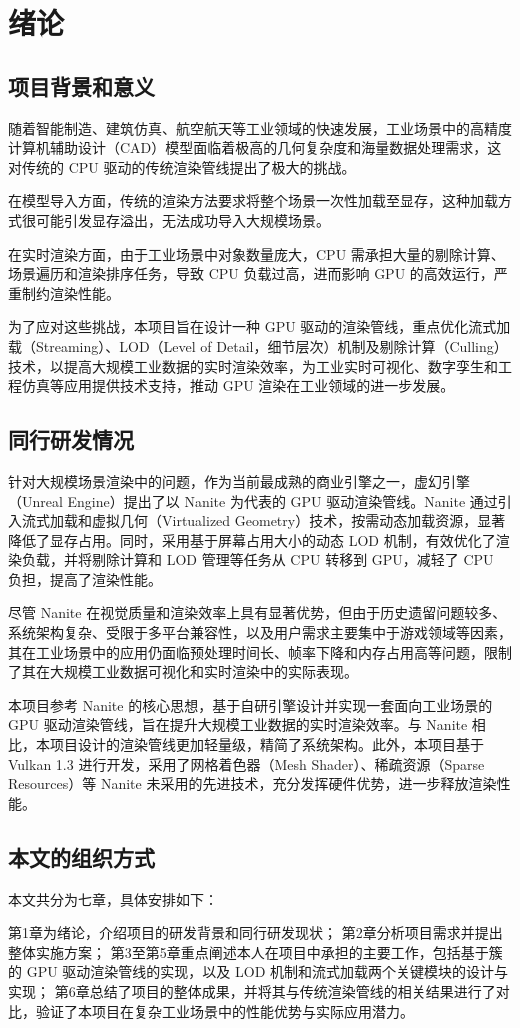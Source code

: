 \cleardoublepage

\section{绪论}

\subsection{项目背景和意义}
随着智能制造、建筑仿真、航空航天等工业领域的快速发展，工业场景中的高精度计算机辅助设计（CAD）模型面临着极高的几何复杂度和海量数据处理需求\cite{CAD}，这对传统的 CPU 驱动的传统渲染管线提出了极大的挑战。

在模型导入方面，传统的渲染方法要求将整个场景一次性加载至显存，这种加载方式很可能引发显存溢出，无法成功导入大规模场景。

在实时渲染方面，由于工业场景中对象数量庞大，CPU 需承担大量的剔除计算、场景遍历和渲染排序任务，导致 CPU 负载过高，进而影响 GPU 的高效运行，严重制约渲染性能\cite{WangWei2011}。

为了应对这些挑战，本项目旨在设计一种 GPU 驱动的渲染管线，重点优化流式加载（Streaming）、LOD（Level of Detail，细节层次）机制及剔除计算（Culling）技术，以提高大规模工业数据的实时渲染效率，为工业实时可视化、数字孪生和工程仿真等应用提供技术支持，推动 GPU 渲染在工业领域的进一步发展。

\subsection{同行研发情况}

针对大规模场景渲染中的问题，作为当前最成熟的商业引擎之一，虚幻引擎（Unreal Engine）提出了以 Nanite 为代表的 GPU 驱动渲染管线\cite{Nanite2022}。Nanite 通过引入流式加载和虚拟几何（Virtualized Geometry）技术，按需动态加载资源，显著降低了显存占用。同时，采用基于屏幕占用大小的动态 LOD 机制\cite{Overton2024}，有效优化了渲染负载，并将剔除计算和 LOD 管理等任务从 CPU 转移到 GPU，减轻了 CPU 负担，提高了渲染性能。

尽管 Nanite 在视觉质量和渲染效率上具有显著优势，但由于历史遗留问题较多、系统架构复杂、受限于多平台兼容性，以及用户需求主要集中于游戏领域等因素，其在工业场景中的应用仍面临预处理时间长、帧率下降和内存占用高等问题，限制了其在大规模工业数据可视化和实时渲染中的实际表现\cite{mattrg2023}。

本项目参考 Nanite 的核心思想，基于自研引擎设计并实现一套面向工业场景的 GPU 驱动渲染管线，旨在提升大规模工业数据的实时渲染效率。与 Nanite 相比，本项目设计的渲染管线更加轻量级，精简了系统架构。此外，本项目基于 Vulkan 1.3 进行开发，采用了网格着色器（Mesh Shader）、稀疏资源（Sparse Resources）等 Nanite 未采用的先进技术，充分发挥硬件优势，进一步释放渲染性能。

\subsection{本文的组织方式}

本文共分为七章，具体安排如下：

第1章为绪论，介绍项目的研发背景和同行研发现状；
第2章分析项目需求并提出整体实施方案；
第3至第5章重点阐述本人在项目中承担的主要工作，包括基于簇的 GPU 驱动渲染管线的实现，以及 LOD 机制和流式加载两个关键模块的设计与实现；
第6章总结了项目的整体成果，并将其与传统渲染管线的相关结果进行了对比，验证了本项目在复杂工业场景中的性能优势与实际应用潜力。